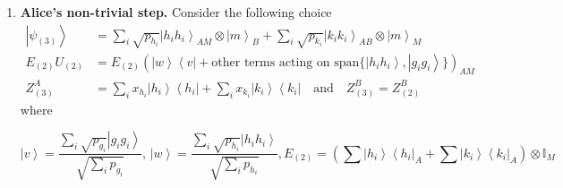 \documentclass{theoretics}
\begin{document}
\begin{enumerate}
        and $$(2)\quad U^\dagger_{(1)}\left(Z_{(2)}^{B}\otimes\mathbb{I}_{M}\right)U_{(1)}\ge\left(Z_{(1)}^{B}\otimes\mathbb{I}_{M}\right).$$
        \begin{proof}
          We have to prove that the above properties (1) and (2) are satisfied.
          (1) It follows trivially from the defining action of $U_{(1)}$.\\
          (2) For ease of notation, let $U=U_{(1)}$ and note that $U^{\dagger}=U$,
          so that we can write 
          \begin{align*}
            &U\left(Z_{(2)}^{B}\otimes\mathbb{I}_{M}\right)U\\
            & =y\left(U\left(\mathbb{I}_{B}^{\{\vec{g},m\}}\otimes\mathbb{I}_{M}^{\{\vec{g},m\}}\right)U+U\underbrace{\left(\mathbb{I}_{B}^{\{\vec{g},m\}}\otimes\mathbb{I}_{M}^{\{\vec{k},\vec{h}\}}\right)}_{\text{outside }U\text{'s action space}}U\right)+U\underbrace{\left(\sum y_{k_{i}}\left|k_{i}\right\rangle \left\langle k_{i}\right|\otimes\mathbb{I}\right)}_{\text{outside }U\text{'s action space}}U \\ &=Z_{(2)}\otimes\mathbb{I}_{M}\ge Z_{(1)}\otimes\mathbb{I}_{M}
          \end{align*}
          so long\footnote{By the action space of $U$ we mean the space where $U$ acts non-trivially.} as $y\ge y_{g_{i}}$, which is guaranteed by the choice of
          $y$.
        \end{proof}
  \item \textbf{Alice's non-trivial step. }Consider the following choice
        \begin{align*}
          \left|\psi_{(3)}\right\rangle & =\sum_{i}\sqrt{p_{h_{i}}}\left|h_{i}h_{i}\right\rangle _{AM}\otimes\left|m\right\rangle _{B}+\sum_{i}\sqrt{p_{k_{i}}}\left|k_{i}k_{i}\right\rangle _{AB}\otimes\left|m\right\rangle _{M} \\
          E_{(2)}U_{(2)}                & =E_{(2)}\left(\left|w\right\rangle \left\langle v\right|+\text{other terms acting on span\{}\left|h_{i}h_{i}\right\rangle ,\left|g_{i}g_{i}\right\rangle \}\right)_{AM}                  \\
          Z_{(3)}^{A}                   & =\sum_{i}x_{h_{i}}\left|h_{i}\right\rangle \left\langle h_{i}\right|+\sum_{i}x_{k_{i}}\left|k_{i}\right\rangle \left\langle k_{i}\right|\ \ \ \text{ and }\ \ \
          Z_{(3)}^{B}  =Z_{(2)}^{B}
        \end{align*}
        where \begin{footnotesize}
          \begin{displaymath}\left|v\right\rangle =\frac{\sum_{i}\sqrt{p_{g_{i}}}\left|g_{i}g_{i}\right\rangle }{\sqrt{\sum_{i}p_{g_{i}}}},\,\left|w\right\rangle =\frac{\sum_{i}\sqrt{p_{h_{i}}}\left|h_{i}h_{i}\right\rangle }{\sqrt{\sum_{i}p_{h_{i}}}},
            E_{(2)}=\left(\sum\left|h_{i}\right\rangle \left\langle h_{i}\right|_{A}+\sum\left|k_{i}\right\rangle \left\langle k_{i}\right|_{A}\right)\otimes\mathbb{I}_{M}
          \end{displaymath}


\end{footnotesize}
\end{enumerate}
\end{document}
